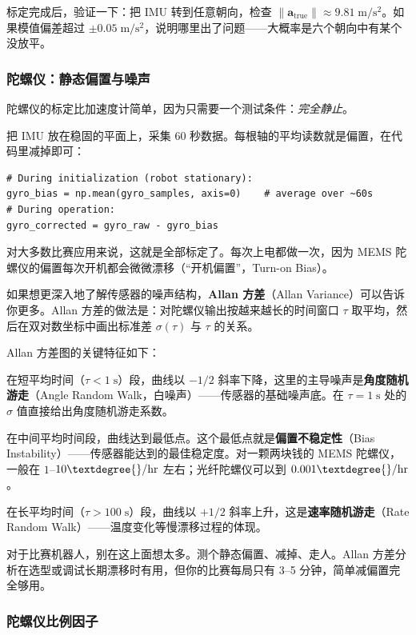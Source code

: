 标定完成后，验证一下：把 IMU 转到任意朝向，检查 $\|\mathbf{a}_{\text{true}}\| \approx 9.81\;\mathrm{m/s^2}$。如果模值偏差超过 $\pm 0.05\;\mathrm{m/s^2}$，说明哪里出了问题——大概率是六个朝向中有某个没放平。

\subsubsection{陀螺仪：静态偏置与噪声}

陀螺仪的标定比加速度计简单，因为只需要一个测试条件：\textit{完全静止}。

把 IMU 放在稳固的平面上，采集 60 秒数据。每根轴的平均读数就是偏置，在代码里减掉即可：

\begin{verbatim}
# During initialization (robot stationary):
gyro_bias = np.mean(gyro_samples, axis=0)    # average over ~60s
# During operation:
gyro_corrected = gyro_raw - gyro_bias
\end{verbatim}

对大多数比赛应用来说，这就是全部标定了。每次上电都做一次，因为 MEMS 陀螺仪的偏置每次开机都会微微漂移（``开机偏置''，Turn-on Bias）。

如果想更深入地了解传感器的噪声结构，\textbf{Allan 方差}（Allan Variance）可以告诉你更多。Allan 方差的做法是：对陀螺仪输出按越来越长的时间窗口 $\tau$ 取平均，然后在双对数坐标中画出标准差 $\sigma(\tau)$ 与 $\tau$ 的关系。

Allan 方差图的关键特征如下：

在短平均时间（$\tau < 1\;\mathrm{s}$）段，曲线以 $-1/2$ 斜率下降，这里的主导噪声是\textbf{角度随机游走}（Angle Random Walk，白噪声）——传感器的基础噪声底。在 $\tau = 1\;\mathrm{s}$ 处的 $\sigma$ 值直接给出角度随机游走系数。

在中间平均时间段，曲线达到最低点。这个最低点就是\textbf{偏置不稳定性}（Bias Instability）——传感器能达到的最佳稳定度。对一颗两块钱的 MEMS 陀螺仪，一般在 $1$--$10\textdegree{}/\mathrm{hr}$ 左右；光纤陀螺仪可以到 $0.001\textdegree{}/\mathrm{hr}$。

在长平均时间（$\tau > 100\;\mathrm{s}$）段，曲线以 $+1/2$ 斜率上升，这是\textbf{速率随机游走}（Rate Random Walk）——温度变化等慢漂移过程的体现。

对于比赛机器人，别在这上面想太多。测个静态偏置、减掉、走人。Allan 方差分析在选型或调试长期漂移时有用，但你的比赛每局只有 3--5 分钟，简单减偏置完全够用。

\subsubsection{陀螺仪比例因子}

